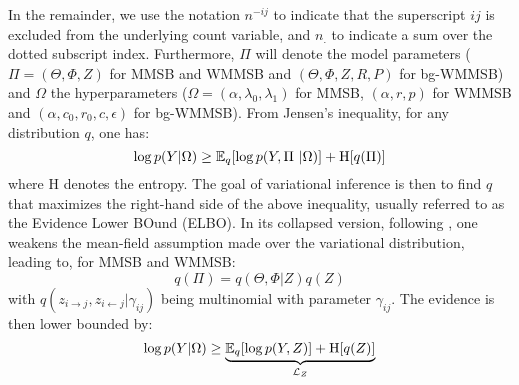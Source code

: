 In the remainder, we use the notation $n^{-ij}$ to indicate that the superscript $ij$ is excluded from the underlying count variable, and $n_{\bm{.}}$ to indicate a sum over the dotted subscript index. Furthermore, $\Pi$ will denote the model parameters ($\Pi = (\Theta,\Phi,Z)$ for MMSB and WMMSB and $(\Theta,\Phi,Z,R,P)$ for bg-WMMSB) and $\Omega$ the hyperparameters ($\Omega = (\alpha,\lambda_0,\lambda_1)$ for MMSB, $(\alpha,r,p)$ for WMMSB and $(\alpha, c_0, r_0, c, \epsilon)$ for bg-WMMSB). From Jensen's inequality, for any distribution $q$, one has:
%
\begin{equation*}
\log p(Y | \Omega) \ge \mathbb{E}_{q}[\log p(Y, \Pi\ | \Omega)] + \textrm{H}[q(\Pi)]
\end{equation*}
%
where $\textrm{H}$ denotes the entropy. The goal of variational inference is then to find $q$ that maximizes the right-hand side of the above inequality, usually referred to as the Evidence Lower BOund (ELBO). In its collapsed version, following \cite{teh2006collapsed}, one weakens the mean-field assumption made over the variational distribution, leading to, for MMSB and WMMSB:
%
\begin{equation*}
q(\Pi) = q(\Theta, \Phi | Z) q(Z)
\end{equation*}
%
with $q(z_{i \rightarrow j}, z_{i \leftarrow j}|\gamma_{ij})$ being multinomial with parameter $\gamma_{ij}$. The evidence is then lower bounded by:
%
\begin{equation*}
\log p(Y|\Omega) \geq \underbrace{\mathbb{E}_{q}[\log p(Y, Z)] + \textrm{H}[q(Z)]}_{\mathcal{L}_Z}
\end{equation*}

